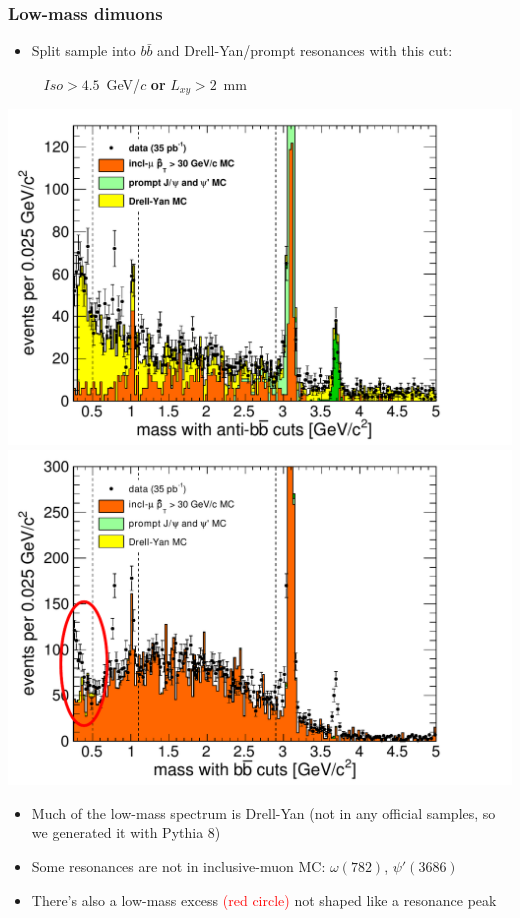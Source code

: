 \documentclass[compress]{beamer}
\begin{document}
\begin{frame}
\frametitle{Low-mass dimuons}

\begin{itemize}
\item Split sample into $b\bar{b}$ and Drell-Yan/prompt resonances with this cut:

\mbox{ } \hfill $Iso > 4.5$~GeV/$c$ {\bf or} $L_{xy} > 2$~mm \hfill \mbox{ }
\label{pag:bbcuts}
\end{itemize}

\includegraphics[width=0.5\linewidth]{support_mass_antibbbar.pdf}
\includegraphics[width=0.5\linewidth]{support_mass_bbbar.pdf}

\begin{itemize}
\item Much of the low-mass spectrum is Drell-Yan (not in any official samples, so we generated it with Pythia 8)
\item Some resonances are not in inclusive-muon MC: $\omega(782)$, $\psi'(3686)$
\item There's also a low-mass excess \textcolor{red}{(red circle)} not shaped like a resonance peak
\end{itemize}
\end{frame}
\end{document}
